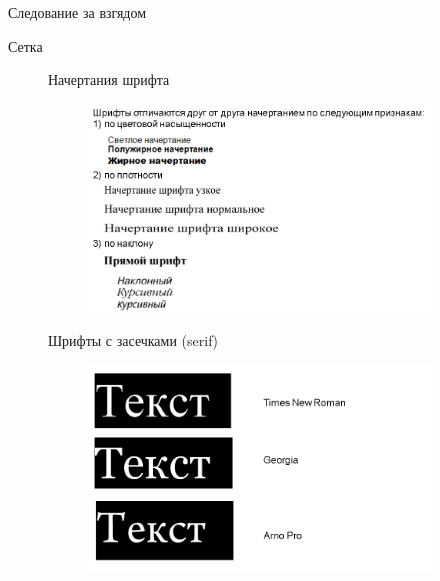 \documentclass{beamer}
\begin{document}
\begin{frame}[t]{Следование за взгядом}
\begin{frame}[t]{Сетка}
\begin{figure}[h]
\begin{frame}[t]{Начертания шрифта}
	\begin{figure}[h]
		\centering
		\includegraphics[scale=0.5]{images/lec05-pic06.png}
	\end{figure}
\end{frame}  

\begin{frame}[t]{Шрифты с засечками (serif)}
	\begin{figure}[h]
		\centering
		\includegraphics[scale=0.5]{images/lec05-pic07.png}
	\end{figure}
\end{frame}  


\end{figure}
\end{frame}
\end{frame}
\end{document}
